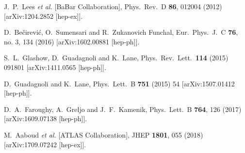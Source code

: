 \documentclass[aps,prd,superscriptaddress,twocolumn,secnumarabic]{revtex4-1}
\begin{document}
\begin{thebibliography}{99}
  J.~P.~Lees {\it et al.} [BaBar Collaboration],
  Phys.\ Rev.\ D {\bf 86}, 012004 (2012)
  [arXiv:1204.2852 [hep-ex]].


  D.~Bečirević, O.~Sumensari and R.~Zukanovich Funchal,
  Eur.\ Phys.\ J.\ C {\bf 76}, no. 3, 134 (2016)
  [arXiv:1602.00881 [hep-ph]].

  S.~L.~Glashow, D.~Guadagnoli and K.~Lane,
  Phys.\ Rev.\ Lett.\  {\bf 114} (2015) 091801
  [arXiv:1411.0565 [hep-ph]].

  D.~Guadagnoli and K.~Lane,
  Phys.\ Lett.\ B {\bf 751} (2015) 54
  [arXiv:1507.01412 [hep-ph]].
  
  D.~A.~Faroughy, A.~Greljo and J.~F.~Kamenik,
  Phys.\ Lett.\ B {\bf 764}, 126 (2017)
  [arXiv:1609.07138 [hep-ph]].


  M.~Aaboud {\it et al.} [ATLAS Collaboration],
  JHEP {\bf 1801}, 055 (2018)
  [arXiv:1709.07242 [hep-ex]].



\end{thebibliography}
\end{document}
